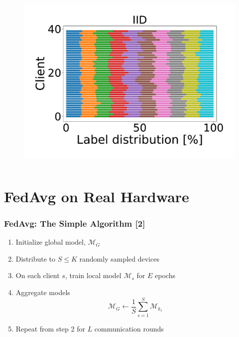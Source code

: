 \documentclass{beamer}
\begin{document}
\begin{frame}
\begin{columns}
\begin{column}{.55\textwidth}
\begin{figure}[htb!]
				\includegraphics[width=0.49\linewidth]{imgs/splits(IID)}
			\end{figure}
		\end{column}
	\end{columns}

\end{frame}

\section{FedAvg on Real Hardware}
\begin{frame}
    \frametitle{FedAvg: The Simple Algorithm [2]}
    \begin{enumerate}
        \item Initialize global model, $\mathcal M_G$
        \item Distribute to $S \le K$ randomly sampled devices
        \item On each client $s$, train local model $\mathcal M_s$ for $E$ epochs
        \item Aggregate models
    \begin{equation*}
        \mathcal M_G \gets \frac{1}{S} \sum_{s=1}^{S} \mathcal M_{k_s}
    \end{equation*}
        \item Repeat from step 2 for $L$ communication rounds
    \end{enumerate}
\end{frame}
\end{document}
